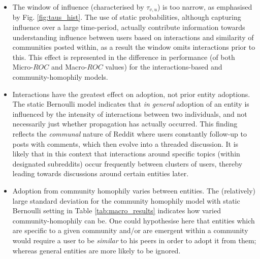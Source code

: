\documentclass[10pt,journal,compsoc]{IEEEtran}
\begin{document}
\begin{itemize}
	\item The window of influence (characterised by $\tau_{v,u}$) is too narrow, as emphasised by Fig. \ref{fig:taus_hist}. 
	The use of static probabilities, although capturing influence over a large time-period, actually contribute information towards understanding influence between users based on interactions and similarity of communities posted within, as a result the window omits interactions prior to this.
	This effect is represented in the difference in performance (of both Micro-$ROC$ and Macro-$ROC$ values) for the interactions-based and community-homophily models.
		
	\item Interactions have the greatest effect on adoption, not prior entity adoptions.
	The static Bernoulli model indicates that \emph{in general} adoption of an entity is influenced by the intensity of interactions between two individuals, and not necessarily just whether propagation has actually occurred.
	This finding reflects the \emph{communal} nature of Reddit where users constantly follow-up to posts with comments, which then evolve into a threaded discussion.
	It is likely that in this context that interactions around specific topics (within designated subreddits) occur frequently between clusters of users, thereby leading towards discussions around certain entities later.
	
	\item Adoption from community homophily varies between entities.
	The (relatively) large standard deviation for the community homophily model with static Bernoulli setting in Table \ref{tab:macro_results} indicates how varied community-homophily can be.
	One could hypothesise here that entities which are specific to a given community and/or are emergent within a community would require a user to be \emph{similar} to his peers in order to adopt it from them; whereas general entities are more likely to be ignored.
	
\end{itemize}
\end{document}
